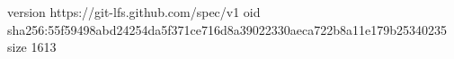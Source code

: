 version https://git-lfs.github.com/spec/v1
oid sha256:55f59498abd24254da5f371ce716d8a39022330aeca722b8a11e179b25340235
size 1613
